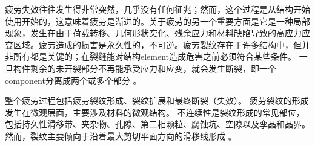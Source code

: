疲劳失效往往发生得非常突然，几乎没有任何征兆；然而，这个过程是从结构开始使用开始的，这意味着疲劳是渐进的。关于疲劳的另一个重要方面是它是一种局部现象，发生在由于荷载转移、几何形状突化、残余应力和材料缺陷导致的高应力应变区域。疲劳造成的损害是永久性的，不可逆。疲劳裂纹存在于许多结构中，但并非所有都是关键的；在裂缝能对结构\gls*{element}造成危害之前必须符合某些条件。 一旦构件剩余的未开裂部分不再能承受应力和应变，就会发生断裂，即一个\gls*{component}分离成两个或多个部分 \cite{stephens2000m}。

整个疲劳过程包括疲劳裂纹形成、裂纹扩展和最终断裂（失效）。 疲劳裂纹的形成发生在微观层面，主要涉及材料的微观结构。 不连续性是裂纹形成的常见部位，包括持久性滑移带、夹杂物、孔隙、第二相颗粒、腐蚀坑、空隙以及孪晶和晶界。 然而，裂纹主要倾向于沿着最大剪切平面方向的滑移线形成 \cite{stephens2000m}。

